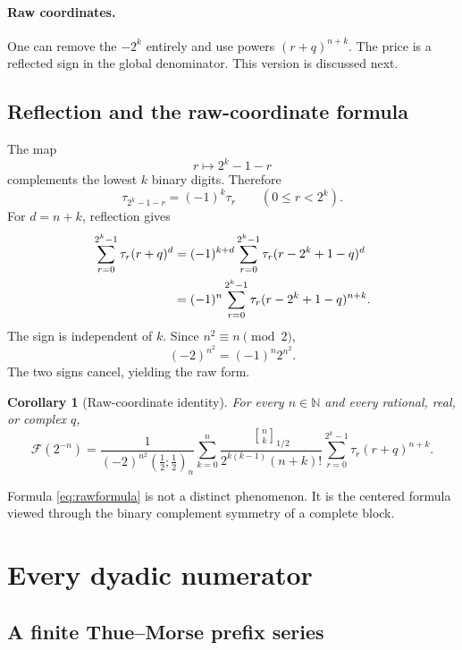 \documentclass[11pt,oneside]{article}
\newtheorem{corollary}[theorem]{Corollary}
\theoremstyle{definition}
\theoremstyle{remark}
\newcommand{\qpoch}[3]{\left(#1;#2\right)_{#3}}
\newcommand{\halfqbinom}[2]{{\genfrac{[}{]}{0pt}{}{#1}{#2}}_{1/2}}
\newcommand{\F}{\mathcal F}
\newcommand{\N}{\mathbb N}
\newcommand{\tm}{\tau}
\begin{document}
\paragraph{Raw coordinates.}
One can remove the $-2^k$ entirely and use powers $(r+q)^{n+k}$.  The price
is a reflected sign in the global denominator.  This version is discussed
next.

\subsection{Reflection and the raw-coordinate formula}

The map
\[
 r\longmapsto 2^k-1-r
\]
complements the lowest $k$ binary digits.  Therefore
\begin{equation}\label{eq:tmreflection}
 \tm_{2^k-1-r}=(-1)^k\tm_r
 \qquad(0\le r<2^k).
\end{equation}
For $d=n+k$, reflection gives
\begin{align}
 \sum_{r=0}^{2^k-1}\tm_r(r+q)^d
 &=(-1)^{k+d}
   \sum_{r=0}^{2^k-1}\tm_r
   (r-2^k+1-q)^d\notag\\
 &=(-1)^n
   \sum_{r=0}^{2^k-1}\tm_r
   (r-2^k+1-q)^{n+k}.\label{eq:rawreflection}
\end{align}
The sign is independent of $k$.  Since $n^2\equiv n\pmod2$,
\[
 (-2)^{n^2}=(-1)^n2^{n^2}.
\]
The two signs cancel, yielding the raw form.

\begin{corollary}[Raw-coordinate identity]\label{cor:rawformula}
For every $n\in\N$ and every rational, real, or complex $q$,
\begin{equation}\label{eq:rawformula}
 \boxed{
 \F(2^{-n})=
 \frac{1}{(-2)^{n^2}\qpoch{\frac12}{\frac12}{n}}
 \sum_{k=0}^{n}
 \frac{\halfqbinom{n}{k}}
      {2^{k(k-1)}(n+k)!}
 \sum_{r=0}^{2^k-1}\tm_r(r+q)^{n+k}.}
\end{equation}
\end{corollary}

Formula \eqref{eq:rawformula} is not a distinct phenomenon.  It is the
centered formula viewed through the binary complement symmetry of a complete
block.

\section{Every dyadic numerator}\label{sec:arbitrarym}

\subsection{A finite Thue--Morse prefix series}
\end{document}
